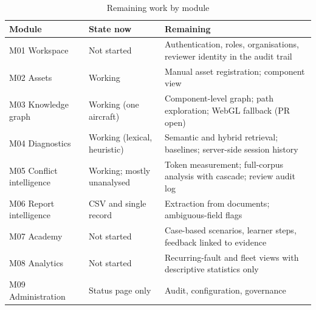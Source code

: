 \begin{table}[H]
\centering
\caption{Remaining work by module}
\label{tab:remaining-modules}
\small
\begin{tabularx}{\textwidth}{@{}>{\raggedright\arraybackslash}p{} >{\raggedright\arraybackslash}p{} L@{}}
\toprule
Module & State now & Remaining \\
\midrule
M01 Workspace & Not started & Authentication, roles, organisations, reviewer identity in the audit trail \\
M02 Assets & Working & Manual asset registration; component view \\
M03 Knowledge graph & Working (one aircraft) & Component-level graph; path exploration; WebGL fallback (PR open) \\
M04 Diagnostics & Working (lexical, heuristic) & Semantic and hybrid retrieval; baselines; server-side session history \\
M05 Conflict intelligence & Working; mostly unanalysed & Token measurement; full-corpus analysis with cascade; review audit log \\
M06 Report intelligence & CSV and single record & Extraction from documents; ambiguous-field flags \\
M07 Academy & Not started & Case-based scenarios, learner steps, feedback linked to evidence \\
M08 Analytics & Not started & Recurring-fault and fleet views with descriptive statistics only \\
M09 Administration & Status page only & Audit, configuration, governance \\
\bottomrule
\end{tabularx}
\end{table}
